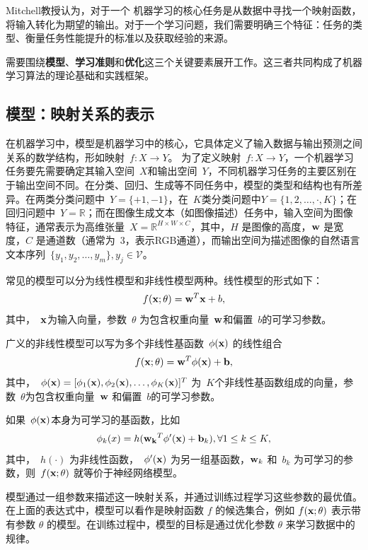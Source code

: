 Mitchell教授认为，对于一个
机器学习的核心任务是从数据中寻找一个映射函数，将输入转化为期望的输出。对于一个学习问题，我们需要明确三个特征：任务的类型、衡量任务性能提升的标准以及获取经验的来源。

需要围绕{\bf 模型}、{\bf 学习准则}和{\bf 优化}这三个关键要素展开工作。这三者共同构成了机器学习算法的理论基础和实践框架。

\subsection{模型：映射关系的表示}

在机器学习中，模型是机器学习中的核心，它具体定义了输入数据与输出预测之间关系的数学结构，形如映射~$f: X \rightarrow Y$。
为了定义映射~$f: X \rightarrow Y$，一个机器学习任务要先需要确定其输入空间~$X$和输出空间~$Y$，不同机器学习任务的主要区别在于输出空间不同。在分类、回归、生成等不同任务中，模型的类型和结构也有所差异。在两类分类问题中~$Y = \{+1,−1\}$，在~$K$类分类问题中$Y =\{1, 2,\dots,· , K\}$；在回归问题中~$Y = \mathbb{R}$；而在图像生成文本（如图像描述）任务中，输入空间为图像特征，通常表示为高维张量~$X=\mathbb{R}^{H\times W\times C}$，其中，$H$ 是图像的高度，${\bf w}$ 是宽度，$C$ 是通道数（通常为~$3$，表示RGB通道），而输出空间为描述图像的自然语言文本序列~$\{y_1,y_2,\dots, y_m \}, y_j\in \mathcal{V}$。


常见的模型可以分为线性模型和非线性模型两种。线性模型的形式如下：
$$
f({\bf x}; \theta)= {\bf w}^T{\bf x} +b, 
$$
其中，~${\bf x}$为输入向量，参数~$\theta$ 为包含权重向量~${\bf w}$和偏置~$b$的可学习参数。

广义的非线性模型可以写为多个非线性基函数~$\phi({\bf x})$ 的线性组合
\begin{equation*}\label{ref}
f({\bf x}; \theta) = {\bf w}^T {\bf \phi}({\bf x}) + {\bf b} , 
\end{equation*}
其中，~$\phi({\bf x}) = [ \phi_1({\bf x}),\phi_2({\bf x}),\dots ,\phi_K({\bf x})]^T$ 为~$K$个非线性基函数组成的向量，参数~$\theta$为包含权重向量~${\bf w}$ 和偏置~$b$的可学习参数。

如果~$\phi({\bf x})$本身为可学习的基函数，比如
\begin{equation*}
\phi_k(x) = h({\bf w_k}^T\phi^\prime({\bf x}) + {\bf b} _k), \forall 1 \le  k \le K,
\end{equation*}  
其中，~$h(\cdot)$ 为非线性函数，~$\phi^\prime ({\bf x})$ 为另一组基函数，${\bf w}_k$ 和~$b_k$ 为可学习的参数，则~$f ({\bf x};\theta)$ 就等价于神经网络模型。

模型通过一组参数来描述这一映射关系，并通过训练过程学习这些参数的最优值。在上面的表达式中，模型可以看作是映射函数 $f$ 的候选集合，例如 $f ({\bf x};\theta)$ 表示带有参数 $\theta$ 的模型。在训练过程中，模型的目标是通过优化参数 $\theta$ 来学习数据中的规律。

